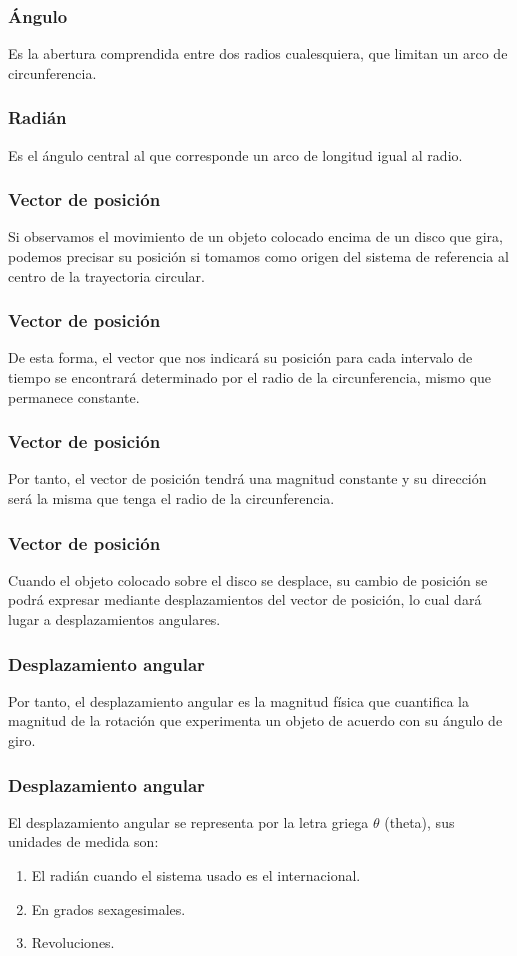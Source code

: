 \documentclass[14pt]{beamer}
\begin{document}
\begin{frame}
\frametitle{Ángulo}
Es la abertura comprendida entre dos radios cualesquiera, que limitan un arco de circunferencia.
\end{frame}
\begin{frame}
\frametitle{Radián}
Es el ángulo central al que corresponde un arco de longitud igual al radio.
\end{frame}
\begin{frame}
\frametitle{Vector de posición}
Si observamos el movimiento de un objeto colocado encima de un disco que gira, \pause podemos precisar su posición si tomamos como origen del sistema de referencia al centro de la trayectoria circular.
\end{frame}
\begin{frame}
\frametitle{Vector de posición}
De esta forma, el vector que nos indicará su posición para cada intervalo de tiempo se encontrará determinado por el radio de la circunferencia, mismo que permanece constante.
\end{frame}
\begin{frame}
\frametitle{Vector de posición}
Por tanto, el vector de posición tendrá una magnitud constante y su dirección será la misma que tenga el radio de la circunferencia.
\end{frame}
\begin{frame}
\frametitle{Vector de posición}
Cuando el objeto colocado sobre el disco se desplace, su cambio de posición se podrá expresar mediante desplazamientos del vector de posición, lo cual dará lugar a desplazamientos angulares.
\end{frame}
\begin{frame}
\frametitle{Desplazamiento angular}
Por tanto, el desplazamiento angular es la magnitud física que cuantifica la magnitud de la rotación que experimenta un objeto de acuerdo con su ángulo de giro.
\end{frame}
\begin{frame}
\frametitle{Desplazamiento angular}
El desplazamiento angular se representa por la letra griega $\theta$ (theta), \pause sus unidades de medida son: 
\pause
{}
\begin{enumerate}[<+->]
\item El radián cuando el sistema usado es el internacional.
\item En grados sexagesimales.
\item Revoluciones.
\end{enumerate}
\end{frame}
\end{document}
